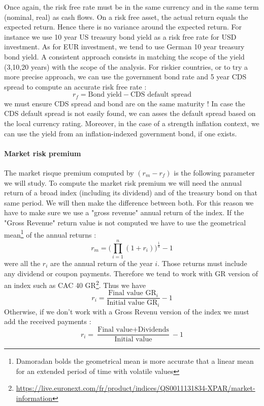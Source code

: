 Once again, the risk free rate must be in the same currency and in the same term (nominal, real) as cash flows. On a risk free asset, the actual return equals the expected return. Hence there is no variance around the expected return. For instance we use 10 year US treasury bond yield as a risk free rate for USD investment. As for EUR investment, we tend to use German 10 year treasury bond yield. A consistent approach consists in matching the scope of the yield (3,10,20 years) with the scope of the analysis. For riskier countries, or to try a more precise approach, we can use the government bond rate and 5 year CDS spread to compute an accurate risk free rate :
\begin{equation}
    r_f = \text{Bond yield} - \text{CDS default spread}
\end{equation}
we must ensure CDS spread and bond are on the same maturity ! In case the CDS default spread is not easily found, we can asses the default spread based on the local currency rating. Moreover, in the case of a strength inflation context, we can use the yield from an inflation-indexed government bond, if one exists.  

\paragraph{Market risk premium}

The market risque premium computed by $(r_m-r_f)$ is the following parameter we will study. To compute the market risk premium we will need the annual  return of a broad index (including its dividend) and of the treasury bond on that same period. We will then make the difference between both. For this reason we have to make sure we use a "gross revenue" annual return of the index. If the "Gross Revenue" return value is not computed we have to use the geometrical mean\footnote{Damoradan bolds the geometrical mean is more accurate that a linear mean for an extended period of time with volatile values} of the annual returns : 
\begin{equation}
    r_m = \bigg( \prod^n_{i=1}(1+r_i)\bigg)^\frac{1}{n}-1
\end{equation}
were all the $r_i$ are the annual return of the year $i$. Those returns must include any dividend or coupon payments. Therefore we tend to work with GR version of an index such as CAC 40 GR\footnote{\href{See more here on Euronext website}{https://live.euronext.com/fr/product/indices/QS0011131834-XPAR/market-information}}. Thus we have
\begin{equation}
    r_i = \frac{\text{Final value GR}_i}{\text{Initial value GR}_i} -1
\end{equation}
Otherwise, if we don't work with a Gross Revenu version of the index we must add the received payments : 
\begin{equation}
    r_i = \frac{\text{Final value} +  \text{Dividends}}{\text{Initial value}} -1
\end{equation}

